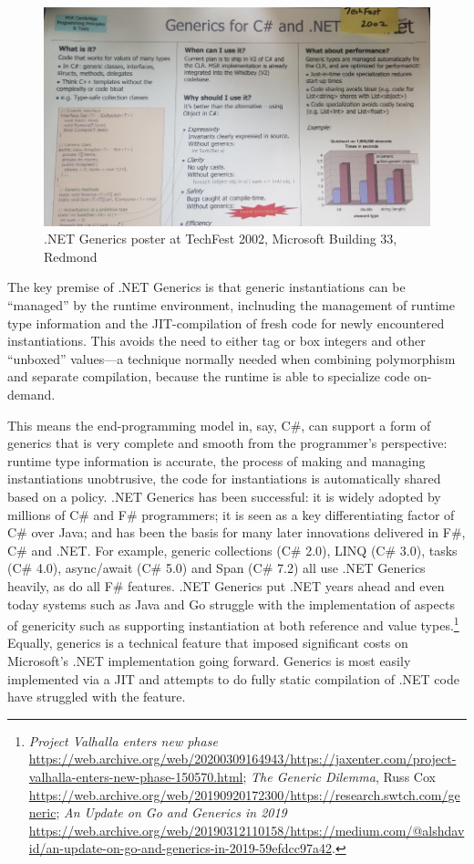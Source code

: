 \documentclass[acmsmall]{acmart}\settopmatter{}
\begin{document}
\begin{figure}

  \includegraphics[width=0.8\linewidth]{fig1.jpg}
  \caption{.NET Generics poster at TechFest 2002, Microsoft Building 33, Redmond}
  \label{fig:fig1}

\end{figure}

The key premise of .NET Generics is that generic instantiations can be “managed” by the runtime environment, inclnuding the management of runtime type information
and the JIT-compilation of fresh code for newly encountered instantiations.  This avoids the need to either tag or box integers and other “unboxed” values---a technique
normally needed when combining polymorphism and separate compilation, because the runtime is able to specialize code on-demand.

This means the end-programming model in, say, C\#, can support a form of generics that is very complete and smooth from the programmer’s perspective:
runtime type information is accurate, the process of making and managing instantiations unobtrusive, the code for instantiations is automatically shared based on a
policy. .NET Generics has been successful: it is widely adopted by millions of C\# and F\# programmers; it is seen as a key differentiating factor of C\# over Java; and
has been the basis for many later innovations delivered in F\#, C\# and .NET. For example, generic collections (C\# 2.0), LINQ (C\# 3.0), tasks (C\# 4.0),
async/await (C\# 5.0) and Span (C\# 7.2) all use .NET Generics heavily, as do all F\# features. .NET Generics put .NET years ahead and even today systems such as
Java and Go struggle with the implementation of aspects of genericity such as supporting instantiation at both reference and value types.\footnote{\textit{Project Valhalla enters new phase} \url{https://web.archive.org/web/20200309164943/https://jaxenter.com/project-valhalla-enters-new-phase-150570.html}; \textit{The Generic Dilemma}, Russ Cox \url{https://web.archive.org/web/20190920172300/https://research.swtch.com/generic}; \textit{An Update on Go and Generics in 2019} \url{https://web.archive.org/web/20190312110158/https://medium.com/@alshdavid/an-update-on-go-and-generics-in-2019-59efdcc97a42}.}  Equally, generics is
a technical feature that imposed significant costs on Microsoft’s .NET implementation going forward. Generics is most easily implemented via a JIT and attempts to do fully
static compilation of .NET code have struggled with the feature.
\end{document}
